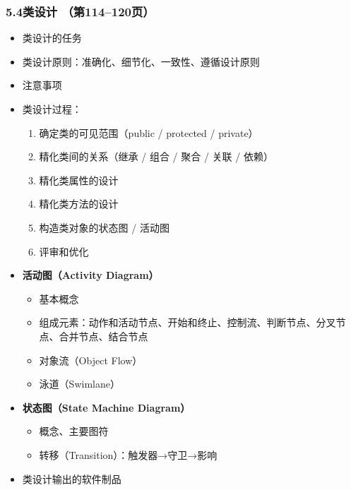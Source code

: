 \documentclass[12pt,a4paper]{ctexart}
\begin{document}
\subsubsection{5.4\quad 类设计 \hfill（第114--120页）}
\begin{itemize}
    \item 类设计的任务
    \item 类设计原则：准确化、细节化、一致性、遵循设计原则
    \item 注意事项
    \item 类设计过程：
    \begin{enumerate}
        \item 确定类的可见范围（public / protected / private）
        \item 精化类间的关系（继承 / 组合 / 聚合 / 关联 / 依赖）
        \item 精化类属性的设计
        \item 精化类方法的设计
        \item 构造类对象的状态图 / 活动图
        \item 评审和优化
    \end{enumerate}
    \item \textbf{活动图（Activity Diagram）}
    \begin{itemize}
        \item 基本概念
        \item 组成元素：动作和活动节点、开始和终止、控制流、判断节点、分叉节点、合并节点、结合节点
        \item 对象流（Object Flow）
        \item 泳道（Swimlane）
    \end{itemize}
    \item \textbf{状态图（State Machine Diagram）}
    \begin{itemize}
        \item 概念、主要图符
        \item 转移（Transition）：触发器→守卫→影响
    \end{itemize}
    \item 类设计输出的软件制品
\end{itemize}
\end{document}
